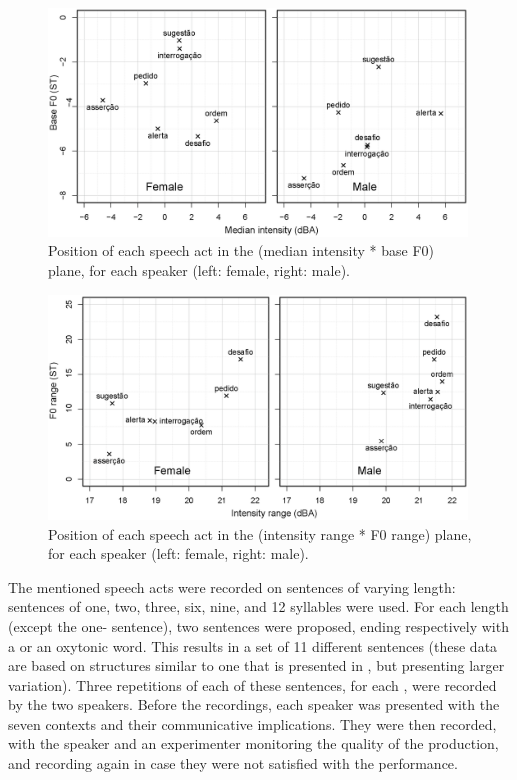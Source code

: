 \documentclass[output=paper]{LSP/langsci}
\begin{document}
\begin{figure}

\includegraphics[width=0.99\textwidth]{figures/MOR1.eps}
\caption{Position of each speech act in the (median intensity * base F0) plane, for each speaker (left: female, right: male). }
\label{figure:f0intbase}
\end{figure}

\begin{figure}

\includegraphics[width=0.99\textwidth]{figures/MOR2.eps}
\caption{Position of each speech act in the (intensity range * F0 range) plane, for each speaker (left: female, right: male).}
\label{figure:f0intrange}
\end{figure}


The mentioned speech acts were recorded on sentences of varying length: sentences of one, two, three, six, nine, and 12 syllables were used. 
For each length (except the one- sentence), two sentences were proposed, ending respectively with a  or an oxytonic word. 
This results in a set of 11 different sentences (these data are based on structures similar to one that is presented in \citealt{moraes2008pitch}, but presenting larger variation). 
Three repetitions of each of these sentences, for each , were recorded by the two speakers.
Before the recordings, each speaker was presented with the seven contexts and their communicative implications. 
They were then recorded, with the speaker and an experimenter monitoring the quality of the production, and recording again in case they were not satisfied with the performance.
\end{document}
